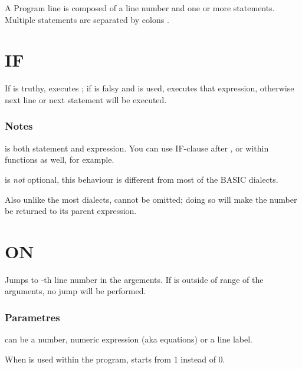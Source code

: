 \label{statements}

A Program line is composed of a line number and one or more statements. Multiple statements are separated by colons \code{:}.

\section{IF}


If  is truthy, executes ; if  is falsy and  is used, executes that expression, otherwise next line or next statement will be executed.

\subsubsection*{Notes}

\begin{itemlist}
\item {} is both statement and expression. You can use IF-clause after , or within functions as well, for example.
\item {} is \emph{not} optional, this behaviour is different from most of the BASIC dialects.
\item Also unlike the most dialects,  cannot be omitted; doing so will make the number be returned to its parent expression.
\end{itemlist}

\section{ON}


Jumps to -th line number in the argements. If  is outside of range of the arguments, no jump will be performed.

\subsubsection*{Parametres}

\begin{itemlist}
\item {} can be a number, numeric expression (aka equations) or a line label.
\item When  is used within the program,  starts from 1 instead of 0.
\end{itemlist}

